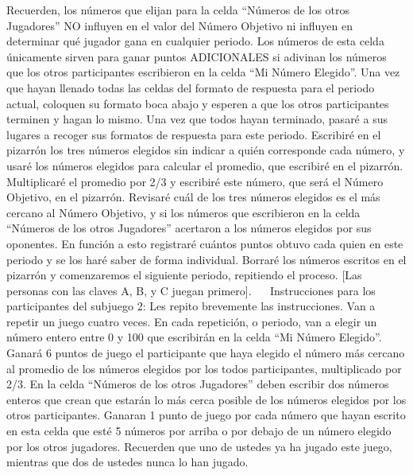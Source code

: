 Recuerden, los números que elijan para la celda “Números de los otros Jugadores” NO influyen en el valor del Número Objetivo ni influyen en determinar qué jugador gana en cualquier periodo. Los números de esta celda únicamente sirven para ganar puntos ADICIONALES si adivinan los números que los otros participantes escribieron en la celda “Mi Número Elegido”.
Una vez que hayan llenado todas las celdas del formato de respuesta para el periodo actual, coloquen su formato boca abajo y esperen a que los otros participantes terminen y hagan lo mismo. Una vez que todos hayan terminado, pasaré a sus lugares a recoger sus formatos de respuesta para este periodo. Escribiré en el pizarrón los tres números elegidos sin indicar a quién corresponde cada número, y usaré los números elegidos para calcular el promedio, que escribiré en el pizarrón. Multiplicaré el promedio por 2/3  y escribiré este número, que será el Número Objetivo, en el pizarrón.
Revisaré cuál de los tres números elegidos es el más cercano al Número Objetivo, y si los números que escribieron en la celda “Números de los otros Jugadores” acertaron a los números elegidos por sus oponentes. En función a esto registraré cuántos puntos obtuvo cada quien en este periodo y se los haré saber de forma individual.
Borraré los números escritos en el pizarrón y comenzaremos el siguiente periodo, repitiendo el proceso.
[Las personas con las claves A, B, y C juegan primero].
 
Instrucciones para los participantes del subjuego 2:
Les repito brevemente las instrucciones. Van a repetir un juego cuatro veces. En cada repetición, o periodo, van a elegir un número entero entre 0 y 100 que escribirán en la celda “Mi Número Elegido”. Ganará 6 puntos de juego el participante que haya elegido el número más cercano al promedio de los números elegidos por los todos participantes, multiplicado por 2/3.
En la celda “Números de los otros Jugadores” deben escribir dos números enteros que crean que estarán lo más cerca posible de los números elegidos por los otros participantes. Ganaran 1 punto de juego por cada número que hayan escrito en esta celda que esté 5 números por arriba o por debajo de un número elegido por los otros jugadores.
Recuerden que uno de ustedes ya ha jugado este juego, mientras que dos de ustedes nunca lo han jugado.
 
